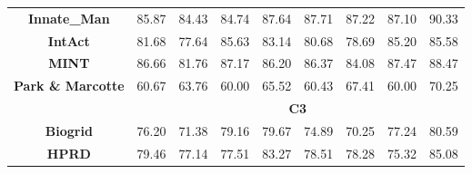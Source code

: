 \begin{table}[]
\begin{tabular}{|c|cccc|cccc|}
    \textbf{Innate\_Man} & \cellcolor[rgb]{ .639,  .749,  .565} 85.87 & \cellcolor[rgb]{ .886,  .937,  .855} 84.43 & \cellcolor[rgb]{ .835,  .898,  .796} 84.74 & \cellcolor[rgb]{ .329,  .51,  .208} 87.64 & \cellcolor[rgb]{ .784,  .859,  .733} 87.71 & \cellcolor[rgb]{ .867,  .922,  .831} 87.22 & \cellcolor[rgb]{ .886,  .937,  .855} 87.10 & \cellcolor[rgb]{ .329,  .51,  .208} 90.33 \\
    \textbf{IntAct} & \cellcolor[rgb]{ .608,  .722,  .529} 81.68 & \cellcolor[rgb]{ .886,  .937,  .855} 77.64 & \cellcolor[rgb]{ .329,  .51,  .208} 85.63 & \cellcolor[rgb]{ .506,  .643,  .412} 83.14 & \cellcolor[rgb]{ .725,  .816,  .671} 80.68 & \cellcolor[rgb]{ .886,  .937,  .855} 78.69 & \cellcolor[rgb]{ .361,  .533,  .243} 85.20 & \cellcolor[rgb]{ .329,  .51,  .208} 85.58 \\
    \textbf{MINT} & \cellcolor[rgb]{ .384,  .553,  .271} 86.66 & \cellcolor[rgb]{ .886,  .937,  .855} 81.76 & \cellcolor[rgb]{ .329,  .51,  .208} 87.17 & \cellcolor[rgb]{ .431,  .588,  .325} 86.20 & \cellcolor[rgb]{ .6,  .718,  .522} 86.37 & \cellcolor[rgb]{ .886,  .937,  .855} 84.08 & \cellcolor[rgb]{ .459,  .608,  .357} 87.47 & \cellcolor[rgb]{ .329,  .51,  .208} 88.47 \\
    \textbf{Park \& Marcotte} & \cellcolor[rgb]{ .82,  .886,  .776} 60.67 & \cellcolor[rgb]{ .51,  .647,  .416} 63.76 & \cellcolor[rgb]{ .886,  .937,  .855} 60.00 & \cellcolor[rgb]{ .329,  .51,  .208} 65.52 & \cellcolor[rgb]{ .867,  .922,  .831} 60.43 & \cellcolor[rgb]{ .486,  .631,  .388} 67.41 & \cellcolor[rgb]{ .886,  .937,  .855} 60.00 & \cellcolor[rgb]{ .329,  .51,  .208} 70.25 \\
    \midrule
          & \multicolumn{8}{c|}{\textbf{C3}} \\
    \midrule
    \textbf{Biogrid} & \cellcolor[rgb]{ .565,  .69,  .482} 76.20 & \cellcolor[rgb]{ .886,  .937,  .855} 71.38 & \cellcolor[rgb]{ .365,  .537,  .251} 79.16 & \cellcolor[rgb]{ .329,  .51,  .208} 79.67 & \cellcolor[rgb]{ .639,  .749,  .565} 74.89 & \cellcolor[rgb]{ .886,  .937,  .855} 70.25 & \cellcolor[rgb]{ .51,  .651,  .42} 77.24 & \cellcolor[rgb]{ .329,  .51,  .208} 80.59 \\
    \textbf{HPRD} & \cellcolor[rgb]{ .678,  .776,  .612} 79.46 & \cellcolor[rgb]{ .886,  .937,  .855} 77.14 & \cellcolor[rgb]{ .855,  .914,  .816} 77.51 & \cellcolor[rgb]{ .329,  .51,  .208} 83.27 & \cellcolor[rgb]{ .706,  .8,  .647} 78.51 & \cellcolor[rgb]{ .718,  .808,  .659} 78.28 & \cellcolor[rgb]{ .886,  .937,  .855} 75.32 & \cellcolor[rgb]{ .329,  .51,  .208} 85.08 \\

\end{tabular}
\end{table}
